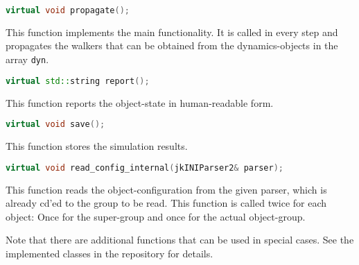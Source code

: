 \begin{lstlisting}[language=c++] 
	virtual void propagate();
\end{lstlisting}	
This function implements the main functionality. It is called in every step and propagates the walkers that can be obtained from the dynamics-objects in the array \texttt{dyn}. 

\begin{lstlisting}[language=c++] 
	virtual std::string report();
\end{lstlisting}	
This function reports the object-state in human-readable form.

\begin{lstlisting}[language=c++] 
	virtual void save();
\end{lstlisting}	
This function stores the simulation results.


\begin{lstlisting}[language=c++] 
	virtual void read_config_internal(jkINIParser2& parser);
\end{lstlisting}	
This function reads the object-configuration from the given parser, which is already cd'ed to the group to be read. This function is called twice for each object: Once for the super-group and once for the actual object-group.

Note that there are additional functions that can be used in special cases. See the implemented classes in the repository for details.
